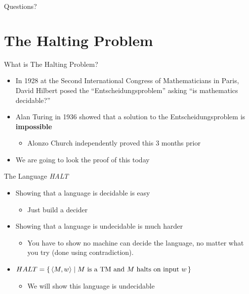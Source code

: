 \documentclass[aspectratio=169]{beamer}
\begin{document}
\begin{frame}{}
    \begin{center}
        {\color{sigma@mainblue} \LARGE Questions?}
    \end{center}
\end{frame}

\section{The Halting Problem}
\frame{\sectionpage}

\begin{frame}{What is The Halting Problem?}
    \begin{itemize}
        \item In 1928 at the Second International Congress of Mathematicians in Paris, David Hilbert posed the ``Entscheidungsproblem'' asking ``is mathematics decidable?'' \pause
        \item Alan Turing in 1936 showed that a solution to the Entscheidungsproblem is \textbf{impossible} 
        \begin{itemize}
            \item Alonzo Church independently proved this 3 months prior
        \end{itemize} \pause
        \item We are going to look the proof of this today 
    \end{itemize}
\end{frame}

\begin{frame}{The Language \emph{HALT}}
    \begin{itemize}
        \item Showing that a language is decidable is easy
        \begin{itemize}
            \item Just build a decider
        \end{itemize} \pause
        \item Showing that a language is undecidable is much harder
        \begin{itemize}
            \item You have to show no machine can decide the language, no matter what you try (done using contradiction).
        \end{itemize} \pause
        \item $HALT = \set{\langle M, w \rangle | \text{$M$ is a TM and $M$ halts on input $w$}}$
        \begin{itemize}
        \item We will show this language is undecidable
        \end{itemize} 
    \end{itemize}
\end{frame}
\end{document}
